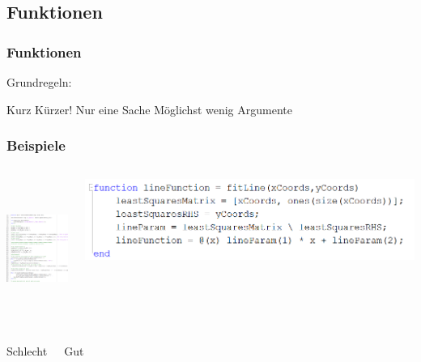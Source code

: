 \documentclass[handout]{beamer}
\begin{document}
\subsection{Funktionen}
\begin{frame}
    \frametitle{Funktionen}
    Grundregeln:

    \begin{outline}
        \pause
        \1 Kurz
        \pause
        \1 Kürzer!
        \pause
        \1 Nur eine Sache
        \pause
        \1 Möglichst wenig Argumente
    \end{outline}
\end{frame}
\begin{frame}
    \frametitle{Beispiele}
    \begin{columns}[t]
        \begin{center}
            \includegraphics[height=4.5cm]{FunktionSchlecht.png}
        \end{center}
        \begin{center}
            \includegraphics[width=\linewidth]{FunktionGut.png}
        \end{center}
    \end{columns}
    \begin{columns}[t]
        \begin{center}
            \huge \color{red} Schlecht
        \end{center}
        \begin{center}
            \huge \color{green} Gut
        \end{center}
    \end{columns}
\end{frame}
\end{document}
